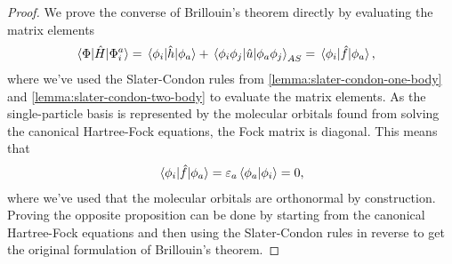             \begin{proof}
                We prove the converse of Brillouin's theorem directly by
                evaluating the matrix elements
                \begin{align}
                    \mel*{\Phi}{\hat{H}}{\Phi^{a}_{i}}
                    &= \mel*{\phi_i}{\hat{h}}{\phi_a}
                    + \mel*{\phi_i\phi_j}{\hat{u}}{\phi_a\phi_j}_{AS}
                    = \mel*{\phi_i}{\hat{f}}{\phi_a},
                \end{align}
                where we've used the Slater-Condon rules from
                \autoref{lemma:slater-condon-one-body} and
                \autoref{lemma:slater-condon-two-body} to evaluate the matrix
                elements.
                As the single-particle basis is represented by the molecular
                orbitals found from solving the canonical Hartree-Fock
                equations, the Fock matrix is diagonal.
                This means that
                \begin{align}
                    \mel*{\phi_i}{\hat{f}}{\phi_a}
                    = \varepsilon_a\braket*{\phi_a}{\phi_i}
                    = 0,
                \end{align}
                where we've used that the molecular orbitals are orthonormal by
                construction.
                Proving the opposite proposition can be done by starting from
                the canonical Hartree-Fock equations and then using the
                Slater-Condon rules in reverse to get the original formulation
                of Brillouin's theorem.
            \end{proof}



